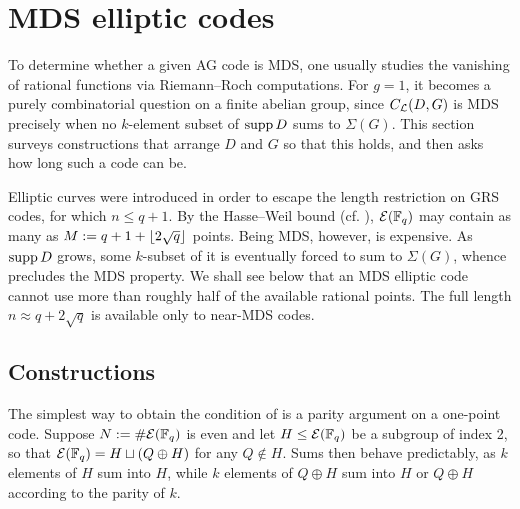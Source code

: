 \documentclass[twocolumn, 11pt]{scrartcl}
\begin{document}

\section{MDS elliptic codes} \label{section:mds-ecc}

To determine whether a given AG code is MDS, one usually studies the vanishing of rational functions via Riemann--Roch computations. For $g=1$, it becomes a purely combinatorial question on a finite abelian group, since $C_\mathcal{L}(D,G)$ is MDS precisely when no $k$-element subset of $\operatorname{supp} D$ sums to $\Sigma(G)$. This section surveys constructions that arrange $D$ and $G$ so that this holds, and then asks how long such a code can be.

Elliptic curves were introduced in order to escape the length restriction on GRS codes, for which $n\leq q+1$. By the Hasse--Weil bound (cf. ), $\mathcal{E}(\mathbb{F}_q)$ may contain as many as $M:=q+1+\lfloor2\sqrt q\rfloor$ points. Being MDS, however, is expensive. As $\operatorname{supp} D$ grows, some $k$-subset of it is eventually forced to sum to $\Sigma(G)$, whence  precludes the MDS property. We shall see below that an MDS elliptic code cannot use more than roughly half of the available rational points. The full length $n\approx q+2\sqrt q$ is available only to near-MDS codes.

\subsection{Constructions}

The simplest way to obtain the condition of  is a parity argument on a one-point code. Suppose $N:=\#\mathcal{E}(\mathbb{F}_q)$ is even and let $H\leq\mathcal{E}(\mathbb{F}_q)$ be a subgroup of index 2, so that $\mathcal{E}(\mathbb{F}_q)=H\sqcup(Q\oplus H)$ for any $Q\notin H$. Sums then behave predictably, as $k$ elements of $H$ sum into $H$, while $k$ elements of $Q\oplus H$ sum into $H$ or $Q\oplus H$ according to the parity of $k$.
\end{document}
